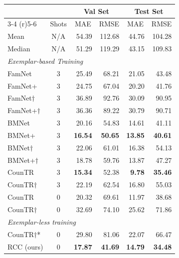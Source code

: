 \begin{tabular}{lcrrrr}
 \toprule
 & &\multicolumn{2}{c}{Val Set} & \multicolumn{2}{c}{Test Set} \\
 \cmidrule(r){3-4} \cmidrule(r){5-6}
\multicolumn{1}{c}{Method} & \multicolumn{1}{c}{Shots} &\multicolumn{1}{c}{MAE} & \multicolumn{1}{c}{RMSE} & \multicolumn{1}{c}{MAE} & \multicolumn{1}{c}{RMSE} \\

\midrule
Mean & N/A & 54.39 & 112.68 & 44.76 & 104.28 \\
Median & N/A & 51.29 & 119.29 & 43.15 & 109.83 \\
    \midrule

\multicolumn{4}{l}{\textit{Exemplar-based Training}} \\
FamNet 
 \cite{ranjan2021Famnet} & 3
& 25.49 & 68.21 & 21.05 & 43.48 \\
FamNet+ 
 \cite{ranjan2021Famnet} & 3
& 24.75 & 67.04
 &  20.20 & 41.76  \\ 
FamNet$\dag$ 
 \cite{ranjan2021Famnet} & 3  &  
 36.89 & 92.76 & 30.09 & 90.95 \\ 
FamNet+$\dag$ 
 \cite{ranjan2021Famnet} & 3
 & 36.36 & 89.22 &  30.79 & 90.71\\ 
BMNet 
 \cite{shi2022represent} & 3 & 20.16 & 54.83  & 14.61  & 41.11 \\
BMNet+ 
 \cite{shi2022represent} & 3
&\textbf{16.54} &  \textbf{50.65}  & \textbf{13.85}  & \textbf{40.61}  \\
BMNet$\dag$ 
 \cite{shi2022represent} & 3
& 22.06 & 61.01 & 16.38 & 54.13\\ 
BMNet+$\dag$  
 \cite{shi2022represent} & 3
& 18.78 & 59.76  & 13.87  & 47.27  \\
\color{gray}
CounTR  \cite{liang2022end} & 3 & 
\textbf{15.34}  &  52.38   &  \textbf{9.78}  & \textbf{ 35.46}\\
\color{gray}
CounTR$\dag$  \cite{liu2022countr} & 3 &
22.19 & 62.54 & 16.80 & 55.03 \\
\color{gray}
CounTR   \cite{liu2022countr} & 0  & 
20.32  &  69.61   &  11.97  &  38.68\\ 
\color{gray}
 CounTR$\dag$  
 \cite{liu2022countr} & 0 &
32.69 & 74.10 & 25.62 & 71.86\\
\midrule
\multicolumn{4}{l}{\textit{Exemplar-less training}} \\
\color{gray}
CounTR$\dag$*  \cite{liu2022countr} & 0 &
29.80 & 81.06 & 22.07 & 66.47 \\
RCC (ours) & 0 & \textbf{17.87}  & \textbf{41.69} &  \textbf{14.79} & \textbf{34.48} \\
\bottomrule
\end{tabular}

